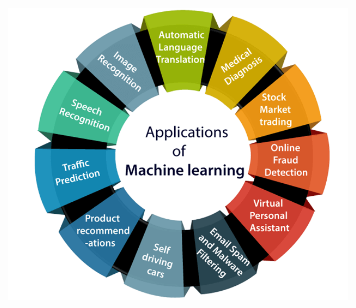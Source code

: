 \begin{frame}
	
	\begin{figure}[!htbp]
		\centering
		\includegraphics[width=9.0cm]{images/intro/ml_applications.png}
	\end{figure}

\end{frame}